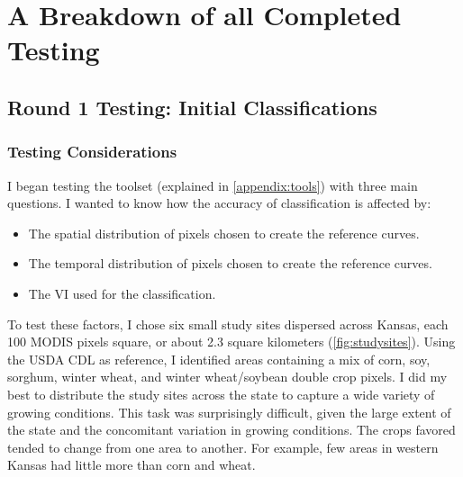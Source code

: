 \chapter{A Breakdown of all Completed Testing}
\label{appendix:testing}

\section{Round 1 Testing: Initial Classifications}
\label{appendix:testing:r1}
\subsection*{Testing Considerations}

I began testing the toolset (explained in \autoref{appendix:tools}) with three main questions. I wanted to know how the accuracy of classification is affected by:

\begin{Spacing}{1.2}
\begin{itemize}
  \item The spatial distribution of pixels chosen to create the reference curves.
  \item The temporal distribution of pixels chosen to create the reference curves.
  \item The VI used for the classification.
\end{itemize}
\end{Spacing}

To test these factors, I chose six small study sites dispersed across Kansas, each 100 MODIS pixels square, or about 2.3 square kilometers (\autoref{fig:studysites}). Using the USDA CDL as reference, I identified areas containing a mix of corn, soy, sorghum, winter wheat,  and winter wheat/soybean double crop pixels. I did my best to distribute the study sites across the state to capture a wide variety of growing conditions. This task was surprisingly difficult, given the large extent of the state and the concomitant variation in growing conditions. The crops favored tended to change from one area to another. For example, few areas in western Kansas had little more than corn and wheat.

